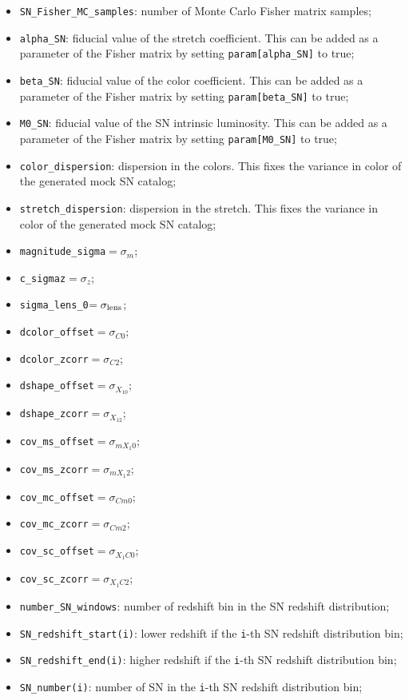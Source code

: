 \documentclass[prd,nofootinbib,showpacs]{revtex4}
\newcommand{\code}[1]{\lstinline|#1|}
\begin{document}
\begin{itemize}
\item \code{SN_Fisher_MC_samples}: number of Monte Carlo Fisher matrix samples;
\item \code{alpha_SN}: fiducial value of the stretch coefficient. This can be added as a parameter of the Fisher matrix by setting \code{param[alpha_SN]} to true;
\item \code{beta_SN}: fiducial value of the color coefficient. This can be added as a parameter of the Fisher matrix by setting \code{param[beta_SN]} to true;
\item \code{M0_SN}: fiducial value of the SN intrinsic luminosity. This can be added as a parameter of the Fisher matrix by setting \code{param[M0_SN]} to true;
\item \code{color_dispersion}: dispersion in the colors. This fixes the variance in color of the generated mock SN catalog;
\item \code{stretch_dispersion}: dispersion in the stretch. This fixes the variance in color of the generated mock SN catalog;
\item \code{magnitude_sigma}$=\sigma_m$;
\item \code{c_sigmaz}$=\sigma_z$;
\item \code{sigma_lens_0}$=\sigma_{\rm lens}$;
\item \code{dcolor_offset}$=\sigma_{C0}$;
\item \code{dcolor_zcorr}$=\sigma_{C2}$;
\item \code{dshape_offset}$=\sigma_{X_10}$;
\item \code{dshape_zcorr}$=\sigma_{X_12}$;
\item \code{cov_ms_offset}$=\sigma_{mX_1 0}$;
\item \code{cov_ms_zcorr}$=\sigma_{mX_1 2}$;
\item \code{cov_mc_offset}$=\sigma_{Cm 0}$;
\item \code{cov_mc_zcorr}$=\sigma_{Cm 2}$;
\item \code{cov_sc_offset}$=\sigma_{X_1C 0}$;
\item \code{cov_sc_zcorr}$=\sigma_{X_1C 2}$;
\item\code{number_SN_windows}: number of redshift bin in the SN redshift distribution;
\item \code{SN_redshift_start(i)}: lower redshift if the \code{i}-th  SN redshift distribution bin;
\item \code{SN_redshift_end(i)}: higher redshift if the \code{i}-th  SN redshift distribution bin;
\item \code{SN_number(i)}: number of SN in the \code{i}-th  SN redshift distribution bin;
\end{itemize}
\end{document}
